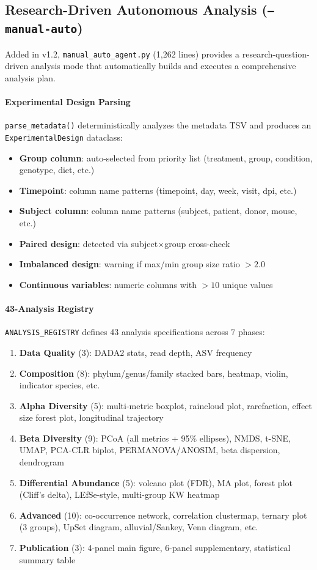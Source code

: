 \documentclass[12pt, a4paper]{article}
\begin{document}
\subsection{Research-Driven Autonomous Analysis (\texttt{--manual-auto})}

Added in v1.2, \texttt{manual\_auto\_agent.py} (1,262 lines) provides a
research-question-driven analysis mode that automatically builds and executes
a comprehensive analysis plan.

\paragraph{Experimental Design Parsing}
\texttt{parse\_metadata()} deterministically analyzes the metadata TSV and produces
an \texttt{ExperimentalDesign} dataclass:
\begin{itemize}[nosep]
  \item \textbf{Group column}: auto-selected from priority list (treatment, group, condition, genotype, diet, etc.)
  \item \textbf{Timepoint}: column name patterns (timepoint, day, week, visit, dpi, etc.)
  \item \textbf{Subject column}: column name patterns (subject, patient, donor, mouse, etc.)
  \item \textbf{Paired design}: detected via subject$\times$group cross-check
  \item \textbf{Imbalanced design}: warning if max/min group size ratio $> 2.0$
  \item \textbf{Continuous variables}: numeric columns with $> 10$ unique values
\end{itemize}

\paragraph{43-Analysis Registry}
\texttt{ANALYSIS\_REGISTRY} defines 43 analysis specifications across 7 phases:
\begin{enumerate}[nosep]
  \item \textbf{Data Quality} (3): DADA2 stats, read depth, ASV frequency
  \item \textbf{Composition} (8): phylum/genus/family stacked bars, heatmap, violin,
    indicator species, etc.
  \item \textbf{Alpha Diversity} (5): multi-metric boxplot, raincloud plot,
    rarefaction, effect size forest plot, longitudinal trajectory
  \item \textbf{Beta Diversity} (9): PCoA (all metrics + 95\% ellipses), NMDS,
    t-SNE, UMAP, PCA-CLR biplot, PERMANOVA/ANOSIM, beta dispersion, dendrogram
  \item \textbf{Differential Abundance} (5): volcano plot (FDR), MA plot,
    forest plot (Cliff's delta), LEfSe-style, multi-group KW heatmap
  \item \textbf{Advanced} (10): co-occurrence network, correlation clustermap,
    ternary plot (3 groups), UpSet diagram, alluvial/Sankey, Venn diagram, etc.
  \item \textbf{Publication} (3): 4-panel main figure, 6-panel supplementary,
    statistical summary table
\end{enumerate}
\end{document}
